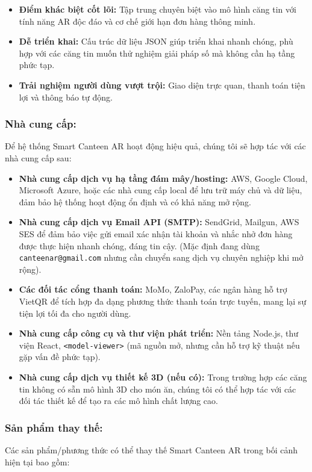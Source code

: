 \documentclass[12pt,a4paper]{article}
\begin{document}
\begin{itemize}[label=\textbullet]
    \item \textbf{Điểm khác biệt cốt lõi:} Tập trung chuyên biệt vào mô hình căng tin với tính năng AR độc đáo và cơ chế giới hạn đơn hàng thông minh.
    \item \textbf{Dễ triển khai:} Cấu trúc dữ liệu JSON giúp triển khai nhanh chóng, phù hợp với các căng tin muốn thử nghiệm giải pháp số mà không cần hạ tầng phức tạp.
    \item \textbf{Trải nghiệm người dùng vượt trội:} Giao diện trực quan, thanh toán tiện lợi và thông báo tự động.
\end{itemize}

\subsubsection{Nhà cung cấp:}
Để hệ thống Smart Canteen AR hoạt động hiệu quả, chúng tôi sẽ hợp tác với các nhà cung cấp sau:

\begin{itemize}[label=\textbullet]
    \item \textbf{Nhà cung cấp dịch vụ hạ tầng đám mây/hosting:} AWS, Google Cloud, Microsoft Azure, hoặc các nhà cung cấp local để lưu trữ máy chủ và dữ liệu, đảm bảo hệ thống hoạt động ổn định và có khả năng mở rộng.
    \item \textbf{Nhà cung cấp dịch vụ Email API (SMTP):} SendGrid, Mailgun, AWS SES để đảm bảo việc gửi email xác nhận tài khoản và nhắc nhở đơn hàng được thực hiện nhanh chóng, đáng tin cậy. (Mặc định đang dùng \texttt{canteenar@gmail.com} nhưng cần chuyển sang dịch vụ chuyên nghiệp khi mở rộng).
    \item \textbf{Các đối tác cổng thanh toán:} MoMo, ZaloPay, các ngân hàng hỗ trợ VietQR để tích hợp đa dạng phương thức thanh toán trực tuyến, mang lại sự tiện lợi tối đa cho người dùng.
    \item \textbf{Nhà cung cấp công cụ và thư viện phát triển:} Nền tảng Node.js, thư viện React, \texttt{<model-viewer>} (mã nguồn mở, nhưng cần hỗ trợ kỹ thuật nếu gặp vấn đề phức tạp).
    \item \textbf{Nhà cung cấp dịch vụ thiết kế 3D (nếu có):} Trong trường hợp các căng tin không có sẵn mô hình 3D cho món ăn, chúng tôi có thể hợp tác với các đối tác thiết kế để tạo ra các mô hình chất lượng cao.
\end{itemize}

\subsubsection{Sản phẩm thay thế:}
Các sản phẩm/phương thức có thể thay thế Smart Canteen AR trong bối cảnh hiện tại bao gồm:
\end{document}
